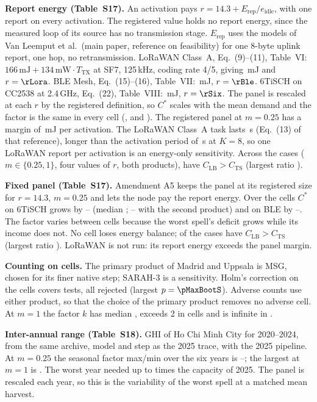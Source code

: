 \documentclass[10pt]{article}
\begin{document}
\textbf{Report energy (Table~S17).} An activation pays $r=14.3+E_{\mathrm{rep}}/e_{\mathrm{idle}}$, with one report on every activation. The registered value holds no report energy, since the measured loop of its source has no transmission stage. $E_{\mathrm{rep}}$ uses the models of Van Leemput et al.\ (main paper, reference on feasibility) for one 8-byte uplink report, one hop, no retransmission. LoRaWAN Class~A, Eq.~(9)--(11), Table~VI: $166\,\mathrm{mJ}+134\,\mathrm{mW}\cdot T_{\mathrm{TX}}$ at SF7, 125\,kHz, coding rate 4/5, giving \ErepLora\,mJ and $r=\rLora$. BLE Mesh, Eq.~(15)--(16), Table~VII: \ErepBle\,mJ, $r=\rBle$. 6TiSCH on CC2538 at 2.4\,GHz, Eq.~(22), Table~VIII: \ErepSix\,mJ, $r=\rSix$. The panel is rescaled at each $r$ by the registered definition, so $C^*$ scales with the mean demand and the factor is the same in every cell (\kBle, \kSix{} and \kLora). The registered panel at $m=0.25$ has a margin of \PanelMarginQ\,mJ per activation. The LoRaWAN Class~A task lasts \TaskLora\,s (Eq.~(13) of that reference), longer than the activation period of \ActPeriod\,s at $K=8$, so one LoRaWAN report per activation is an energy-only sensitivity. Across the \AivNcases{} cases ($m\in\{0.25,1\}$, four values of $r$, both products), \AivNviol{} have $C_{\mathrm{LB}}>C_{\mathrm{TS}}$ (largest ratio \AivMaxLB).

\textbf{Fixed panel (Table~S17).} Amendment A5 keeps the panel at its registered size for $r=14.3$, $m=0.25$ and lets the node pay the report energy. Over the \nCellsSS{} cells $C^*$ on 6TiSCH grows by \AvSixMin--\AvSixMax{} (median \AvSixMed; \AvSixSecMin--\AvSixSecMax{} with the second product) and on BLE by \AvBleMin--\AvBleMax. The factor varies between cells because the worst spell's deficit grows while its income does not. No cell loses energy balance; \AvNviol{} of the \AvNcases{} cases have $C_{\mathrm{LB}}>C_{\mathrm{TS}}$ (largest ratio \AvMaxLB). LoRaWAN is not run: its report energy exceeds the panel margin.

\textbf{Counting on \nCellsSS{} cells.} The primary product of Madrid and Uppsala is MSG, chosen for its finer native step; SARAH-3 is a sensitivity. Holm's correction on the \nCellsSS{} cells covers \nHolmS{} tests, all rejected (largest $p=\pMaxBootS$). Adverse counts use either product, so that the choice of the primary product removes no adverse cell. At $m=1$ the factor $k$ has median \KMedMoneS, exceeds 2 in \KGtTwoMoneS{} cells and is infinite in \KInfMoneS.

\textbf{Inter-annual range (Table~S18).} GHI of Ho Chi Minh City for 2020--2024, from the same archive, model and step as the 2025 trace, with the 2025 pipeline. At $m=0.25$ the seasonal factor max/min over the six years is \AivbLo--\AivbHi; the largest at $m=1$ is \AivbHiMone. The worst year needed up to \AivbOverFive{} times the capacity of 2025. The panel is rescaled each year, so this is the variability of the worst spell at a matched mean harvest.
\end{document}
